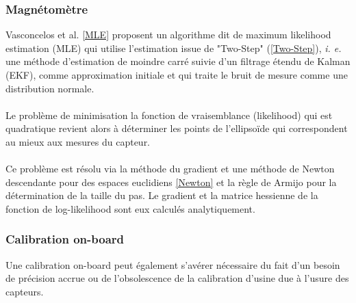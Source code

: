 \subsubsection{Magn\'etom\`etre}

	Vasconcelos et al. \ref{MLE} proposent un algorithme dit de maximum likelihood estimation (MLE) qui utilise l'estimation issue de "Two-Step" (\ref{Two-Step}), \emph{i. e.} une m\'ethode d'estimation de moindre carr\'e suivie d'un filtrage \'etendu de Kalman (EKF), comme approximation initiale et qui traite le bruit de mesure comme une distribution normale.
\\
\\
	Le probl\`eme de minimisation  la fonction  de vraisemblance (likelihood) qui est quadratique revient alors \`a d\'eterminer les points de l'ellipso\"{i}de  qui correspondent au mieux aux mesures du capteur.
\\
\\
	Ce probl\`eme est r\'esolu via la m\'ethode du gradient et une m\'ethode de Newton descendante pour des espaces euclidiens \ref{Newton} et la r\`egle de Armijo pour la d\'etermination de la taille du pas. Le gradient et la matrice hessienne de la fonction de log-likelihood sont eux calcul\'es analytiquement. 

\subsubsection{Calibration on-board}

	Une calibration on-board peut \'egalement s'av\'erer n\'ecessaire du fait d'un besoin de pr\'ecision accrue ou de l'obsolescence de la calibration d'usine due \`a l'usure des capteurs.
